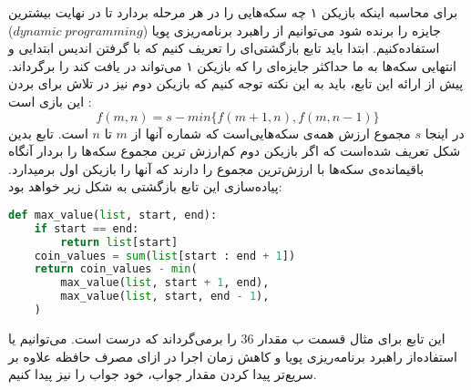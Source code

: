 \documentclass[]{article}
\begin{document}
برای محاسبه اینکه بازیکن ۱ چه سکه‌هایی را در هر مرحله بردارد تا در نهایت
بیشترین جایزه را برنده شود می‌توانیم از راهبرد برنامه‌ریزی پویا ($dynamic \; programming$)
استفاده‌کنیم. ابتدا باید تابع بازگشتی‌ای را تعریف کنیم که با گرفتن اندیس ابتدایی و انتهایی
سکه‌ها به ما حداکثر جایزه‌ای را که بازیکن ۱ می‌تواند در یافت کند را برگرداند.
پیش از ارائه این تابع، باید به این نکته توجه کنیم که بازیکن دوم نیز در تلاش برای
بردن این بازی است :
$$f(m, n) = s - min\lbrace f(m+1, n), f(m, n-1) \rbrace$$
در اینجا $s$ مجموع ارزش همه‌‌ی سکه‌هایی‌است که شماره آنها از $m$ تا $n$ است.
تابع بدین شکل تعریف شده‌است که اگر بازیکن دوم کم‌ارزش ترین مجموع سکه‌ها را بردار آنگاه
باقیمانده‌ی سکه‌ها با ارزش‌ترین مجموع را دارند که آنها را بازیکن اول برمیدارد.
پیاده‌سازی این تابع بازگشتی به شکل زیر خواهد بود:
\begin{latin}
\begin{lstlisting}[language=python]
def max_value(list, start, end):
    if start == end:
        return list[start]
    coin_values = sum(list[start : end + 1])
    return coin_values - min(
        max_value(list, start + 1, end),
        max_value(list, start, end - 1),
    )
\end{lstlisting}
\end{latin}
این تابع برای مثال قسمت ب مقدار $36$ را برمی‌گرداند که درست است.
می‌توانیم یا استفاده‌از راهبرد برنامه‌ریزی پویا و کاهش زمان اجرا در ازای مصرف حافظه
علاوه بر سریع‌تر پیدا کردن مقدار جواب، خود جواب را نیز پیدا کنیم.
\end{document}
